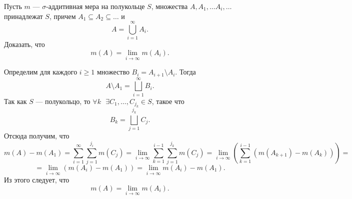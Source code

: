 \begin{task}{7}
Пусть $m$ --- $\sigma$-аддитивная мера на полукольце $S$, множества 
$A, A_1, \dots A_i, \dots$ принадлежат $S$, причем $A_1 \subseteq A_2 \subseteq \dots$ и
$$A = \bigcup_{i=1}^{\infty} A_i.$$
Доказать, что 
$$m(A) = \lim_{i \to \infty} m(A_i).$$
\end{task}

\begin{solution}
Определим для каждого $i \geqslant 1$ множество $B_i = A_{i+1} \setminus A_i$. Тогда 
$$A \setminus A_1 = \bigsqcup_{i=1}^{\infty} B_i.$$
Так как $S$ --- полукольцо, то $\forall k \text{ } \exists C_1, \dots, C_{j_k} \in S$, такое что
$$B_k = \bigsqcup_{j=1}^{j_k}C_j.$$
Отсюда получим, что
$$ m(A) - m(A_1) = \sum_{i=1}^{\infty} \sum_{j=1}^{j_i} m(C_j) = \lim_{i \to \infty} \sum_{k = 1}^{i - 1} \sum_{j=1}^{j_k} m(C_j) = \lim_{i \to \infty} (\sum_{k=1}^{i-1}(m(A_{k+1}) - m(A_k))) = $$
$$ = \lim_{i \to \infty} (m(A_{i}) - m(A_1)) = \lim_{i \to \infty} m(A_i) - m(A_1).$$
Из этого следует, что 
$$m(A) = \lim_{i \to \infty} m(A_i).$$
\end{solution}